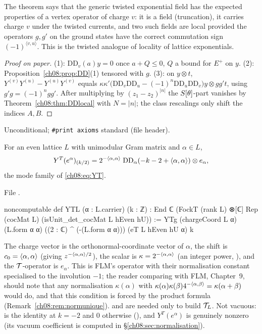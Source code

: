 \begin{physics}
The theorem says that the generic twisted exponential field has the expected properties of a vertex operator of charge $v$: it is a field (truncation), it carries charge $v$ under the twisted currents, and two such fields are local provided the operators $g,g'$ on the ground states have the correct commutation sign $(-1)^{\langle v,u\rangle}$. This is the twisted analogue of locality of lattice exponentials.
\end{physics}
\begin{proof}[Proof on paper]
(1): $\mathrm{DD}_v(a)y=0$ once $a+Q\le0$, $Q$ a bound for $E^+$ on $y$.  (2):
Proposition~\ref{ch08:prop:DD}(1) tensored with $g$.  (3): on $y\otimes t$,
$Y^{(v)}Y^{(u)}-Y^{(u)}Y^{(v)}$ equals
$\kappa\kappa'\bigl(\mathrm{DD}_v\mathrm{DD}_u-(-1)^n\mathrm{DD}_u\mathrm{DD}_v\bigr)y\otimes gg't$,
using $g'g=(-1)^ngg'$.  After multiplying by $(z_1-z_2)^{|n|}$ the $S[\theta]$-part vanishes by
Theorem~\ref{ch08:thm:DDlocal} with $N=|n|$; the class rescalings only shift the indices $A,B$.
\end{proof}
\begin{status}
Unconditional; \texttt{\#print axioms} standard (file header).
\end{status}

\begin{definition}\label{ch08:def:YTL}
For an even lattice $L$ with unimodular Gram matrix and $\alpha\in L$,
\begin{equation*}
  Y^T(e^\alpha)_{(k/2)}=2^{-\langle \alpha,\alpha\rangle}\;\mathrm{DD}_{\alpha}(-k-2+\langle \alpha,\alpha\rangle)\otimes e_\alpha ,
\end{equation*}
the mode family of \eqref{ch08:eq:YT}.
\end{definition}
\noindent File .
\begin{leancode}
noncomputable def YTL (α : L.carrier) (k : ℤ) :
    End ℂ (FockT (rank L) ⊗[ℂ] Rep (cocMat L) (isUnit_det_cocMat L hEven hU)) :=
  YTg (chargeCoord L α) (L.form α α) ((2 : ℂ) ^ (-(L.form α α))) (eT L hEven hU α) k
\end{leancode}
\begin{dictionary}
The charge vector is the orthonormal-coordinate vector of $\alpha$, the shift is
$c_0=\langle \alpha,\alpha\rangle$ (giving $z^{-\langle \alpha,\alpha\rangle/2}$), the scalar is
$\kappa=2^{-\langle \alpha,\alpha\rangle}$ (an integer power, ), and the $\mathcal{T}$-operator
is $e_\alpha$.  This is FLM's operator with their normalisation constant specialised to the
involution $-1$; the reader comparing with FLM, Chapter~9, should note that any
normalisation $\kappa(\alpha)$ with $\kappa(\alpha)\kappa(\beta)4^{-\langle \alpha,\beta\rangle}=\kappa(\alpha+\beta)$
would do, and that this condition is forced by the product formula
(Remark~\ref{ch08:rem:normunique}).   and  are needed only to build
$\mathcal{T}_L$.  Not vacuous:  is the identity at $k=-2$ and $0$ otherwise
(), and $Y^T(e^\alpha)$ is genuinely nonzero (its vacuum coefficient is computed in
\S\ref{ch08:sec:normalisation}).
\end{dictionary}

